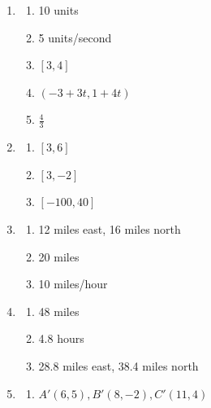 \documentclass{article}
\begin{document}
\begin{enumerate}
\item \begin{enumerate}

	\item 10 units
	
	\item 5 units/second
	
	\item $[3, 4]$
	
	\item $(-3 + 3t, 1 + 4t)$
	
	\item $\frac{4}{3}$

	\end{enumerate}
	
\item \begin{enumerate}

	\item  $[3, 6]$
	
	\item $[3, -2]$
	
	\item $[-100, 40]$
	
	\end{enumerate}

\item \begin{enumerate}

	\item 12 miles east, 16 miles north
	
	\item 20 miles
	
	\item 10 miles/hour

	\end{enumerate}
	
\item \begin{enumerate}

	\item 48 miles
	
	\item 4.8 hours
	
	\item 28.8 miles east, 38.4 miles north
	
	\end{enumerate}
	
\item \begin{enumerate}

	\item $A'(6, 5), B'(8, -2), C'(11, 4)$
	

\end{enumerate}
\end{enumerate}
\end{document}
